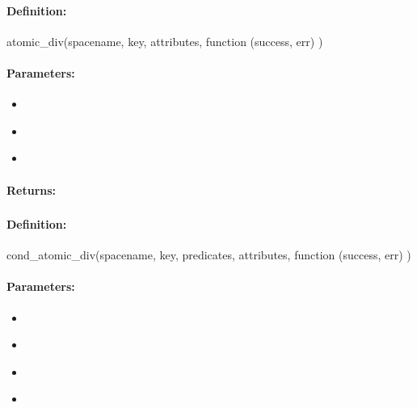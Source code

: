 \paragraph{Definition:}
\begin{javascriptcode}
atomic_div(spacename, key, attributes, function (success, err) {})
\end{javascriptcode}
\paragraph{Parameters:}
\begin{itemize}[noitemsep]
\item {}\\

\item {}\\

\item {}\\

\end{itemize}

\paragraph{Returns:}


\pagebreak
\subsubsection{}
\label{api:nodejs:cond_atomic_div}


\paragraph{Definition:}
\begin{javascriptcode}
cond_atomic_div(spacename, key, predicates, attributes, function (success, err) {})
\end{javascriptcode}
\paragraph{Parameters:}
\begin{itemize}[noitemsep]
\item {}\\

\item {}\\

\item {}\\

\item {}\\

\end{itemize}

